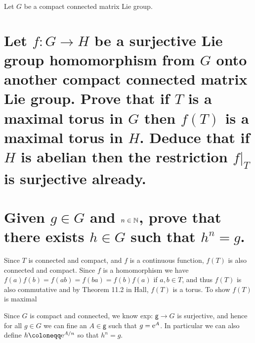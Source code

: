 \documentclass[
	pages,
	boxes,
	color=WildStrawberry
]{homework}
\begin{document}
\begin{problem}
Let $G$ be a compact connected matrix Lie group.
\begin{parts}
	\part{Let $f: G \to H$ be a surjective Lie group homomorphism from $G$ onto another compact connected matrix Lie group. Prove that if $T$ is a maximal torus in $G$ then $f(T)$ is a maximal torus in $H$. Deduce that if $H$ is abelian then the restriction $f|_{T}$ is surjective already.}\label{part:8a}
	\part{Given $g \in G$ and $n \in \mathbb{N}$, prove that there exists $h \in G$ such that $h^n = g$.}\label{part:8b}
\end{parts}

\end{problem}

\begin{solution}
	\ref{part:8a}
	Since $T$ is connected and compact, and $f$ is a continuous function, $f(T)$ is also connected and compact. Since $f$ is a homomorphism we have $f(a)f(b) = f(ab) = f(ba) = f(b)f(a)$ if $a, b\in T$, and thus $f(T)$ is also commutative and by Theorem 11.2 in Hall, $f(T)$ is a torus. To show $f(T)$ is maximal

	\ref{part:8b}
	Since $G$ is compact and connected, we know exp: $\mathsf{g}\to G$ is surjective, and hence for all $g\in G$ we can fine an $A\in\mathsf{g}$ such that $g = \mathrm{e}^{A}$. In particular we can also define $h\defeq \e^{A/n}$ so that $h^n = g$.
\end{solution}
\end{document}
